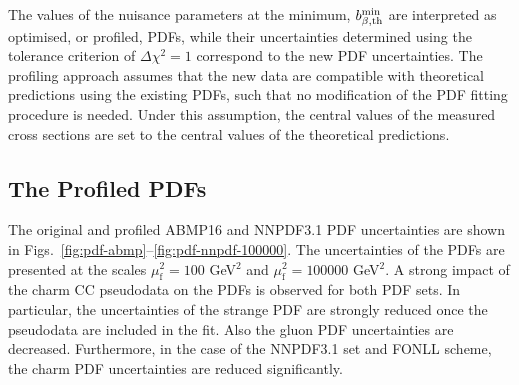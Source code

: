 \documentclass[pdftex,twocolumn,epjc3]{svjour3}          %
\newcommand{\abmp} {ABMP16\xspace}
\newcommand{\nnpdf} {NNPDF3.1\xspace}
\begin{document}
The values of the nuisance parameters at the minimum, $b^{\rm min}_{\beta,\rm th}$ are interpreted as optimised, or profiled, PDFs, while their uncertainties determined using the tolerance criterion of $\Delta\chi^2 = 1$ correspond to the new PDF uncertainties. The profiling approach assumes that the new data are compatible with theoretical predictions using the existing PDFs, such that no modification of the PDF fitting procedure is needed. Under this assumption, the central values of the measured cross sections are set to the central values of the theoretical predictions. 


\subsection{The Profiled PDFs}
\label{sec:profile}

The original and profiled \abmp and \nnpdf PDF uncertainties are shown in Figs.~\ref{fig:pdf-abmp}--\ref{fig:pdf-nnpdf-100000}. 
The uncertainties of the PDFs are presented at the scales $\mu_\mathrm{f}^2=100$ GeV$^2$ and $\mu_\mathrm{f}^2=100000$ GeV$^2$.
A strong impact of the charm CC pseudodata on the PDFs is observed for both PDF sets.
In particular, the uncertainties of the strange PDF are strongly reduced once the pseudodata are included in the fit. 
Also the gluon PDF uncertainties are decreased. Furthermore, in the case of the NNPDF3.1 set and FONLL scheme, the charm PDF uncertainties are reduced significantly.
\end{document}
